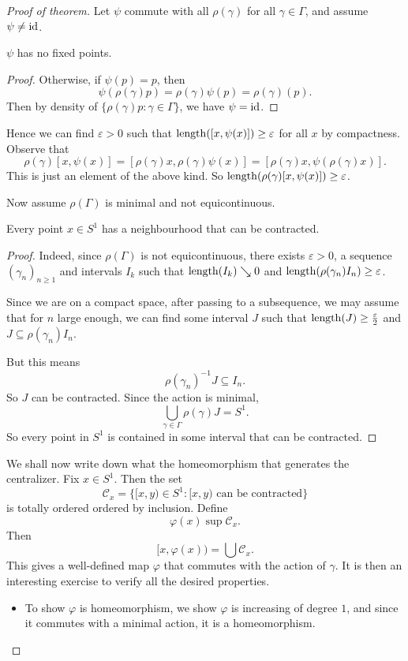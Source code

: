 \documentclass[a4paper]{article}
\begin{document}
\begin{proof}[Proof of theorem]
  Let $\psi$ commute with all $\rho(\gamma)$ for all $\gamma \in \Gamma$, and assume $\psi \not= \operatorname{id}$.
  \begin{claim}
    $\psi$ has no fixed points.
  \end{claim}

  \begin{proof}
    Otherwise, if $\psi(p) = p$, then
    \[
      \psi(\rho(\gamma) p) = \rho(\gamma) \psi(p) = \rho(\gamma)(p).
    \]
    Then by density of $\{\rho(\gamma) p: \gamma \in \Gamma\}$, we have $\psi = \operatorname{id}$.
  \end{proof}

  Hence we can find $\varepsilon > 0$ such that $\operatorname{length}([x, \psi(x)]) \geq \varepsilon$ for all $x$ by compactness. Observe that
  \[
    \rho(\gamma) [x, \psi(x)] = [\rho(\gamma) x, \rho(\gamma) \psi(x)] = [\rho(\gamma) x, \psi(\rho(\gamma)x)].
  \]
  This is just an element of the above kind. So $\operatorname{length}(\rho(\gamma)[x, \psi(x)]) \geq \varepsilon$.

  Now assume $\rho(\Gamma)$ is minimal and not equicontinuous.
  \begin{claim}
    Every point $x \in S^1$ has a neighbourhood that can be contracted.
  \end{claim}

  \begin{proof}
    Indeed, since $\rho(\Gamma)$ is not equicontinuous, there exists $\varepsilon > 0$, a sequence $(\gamma_n)_{n \geq 1}$ and intervals $I_k$ such that $\operatorname{length}(I_k) \searrow 0$ and $\operatorname{length}(\rho(\gamma_n)I_n) \geq \varepsilon$.

    Since we are on a compact space, after passing to a subsequence, we may assume that for $n$ large enough, we can find some interval $J$ such that $\operatorname{length}(J) \geq \frac{\varepsilon}{2}$ and $J \subseteq \rho(\gamma_n) I_n$.

    But this means
    \[
      \rho(\gamma_n)^{-1} J \subseteq I_n.
    \]
    So $J$ can be contracted. Since the action is minimal,
    \[
      \bigcup_{\gamma \in \Gamma} \rho(\gamma) J = S^1.
    \]
    So every point in $S^1$ is contained in some interval that can be contracted.
  \end{proof}

  We shall now write down what the homeomorphism that generates the centralizer. Fix $x \in S^1$. Then the set
  \[
    \mathcal{C}_x = \{[x, y) \in S^1: [x, y)\text{ can be contracted}\}
  \]
  is totally ordered ordered by inclusion. Define
  \[
    \varphi(x) \sup \mathcal{C}_x.
  \]
  Then
  \[
    [x, \varphi(x)) = \bigcup \mathcal{C}_x.
  \]
  This gives a well-defined map $\varphi$ that commutes with the action of $\gamma$. It is then an interesting exercise to verify all the desired properties.
  \begin{itemize}
    \item To show $\varphi$ is homeomorphism, we show $\varphi$ is increasing of degree $1$, and since it commutes with a minimal action, it is a homeomorphism.


\end{itemize}
\end{proof}
\end{document}
